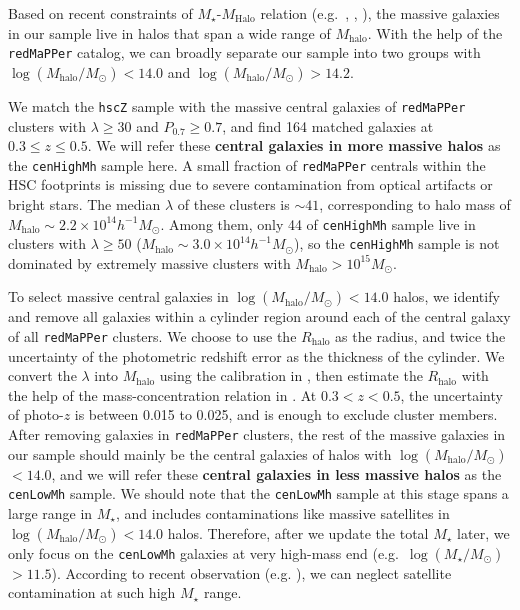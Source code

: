 \documentclass[a4paper,fleqn,usenatbib]{mnras}
\def\arcsec{{\prime\prime}}
\def\redm{\texttt{redMaPPer}}
\def\rbcg{\texttt{cenHighMh}}
\def\nbcg{\texttt{cenLowMh}}
\def\mstar{{$M_{\star}$}}
\def\mhalo{{$M_{\mathrm{halo}}$}}
\def\logms{{$\log (M_{\star}/M_{\odot})$}}
\def\logmh{{$\log (M_{\mathrm{halo}}/M_{\odot})$}}
\begin{document}
    Based on recent constraints of $M_{\star}$-$M_{\mathrm{Halo}}$ relation 
    (e.g.\ \citealt{Leauthaud2012}, \citealt{Behroozi2013}, \citealt{Kravtsov2014}),
    the massive galaxies in our sample live in halos that span a wide range of 
    \mhalo{}.
    With the help of the \redm{} catalog, we can broadly separate our sample into two
    groups with \logmh{}$<14.0$ and \logmh{}$>14.2$.
    
    
    We match the \texttt{hscZ} sample with the massive central galaxies of 
    \redm{} clusters with $\lambda \geq 30$ and $P_{\mathrm{0.7}} \geq 0.7$,
    and find 164 matched galaxies at $0.3 \leq z \leq 0.5$.
    We will refer these \textbf{central galaxies in more massive halos} as the 
    \rbcg{} sample here.
    A small fraction of \redm{} centrals within the HSC footprints is missing  
    due to severe contamination from optical artifacts or bright stars.
    The median $\lambda$ of these clusters is $\sim 41$, corresponding to 
    halo mass of $M_{\mathrm{halo}}\sim 2.2\times 10^{14} h^{-1} M_{\odot}$.
    Among them, only 44 of \rbcg{} sample live in clusters with $\lambda \geq 50$
    ($M_{\mathrm{halo}} \sim 3.0\times 10^{14} h^{-1} M_{\odot}$), so the \rbcg{} sample is 
    not dominated by extremely massive clusters with \mhalo{}$>10^{15} M_{\odot}$. 
    
    To select massive central galaxies in \logmh{}$<14.0$ halos, we identify and 
    remove all galaxies within a cylinder region around each of the central galaxy of 
    all \redm{} clusters.
    We choose to use the $R_{\mathrm{halo}}$ as the radius, and twice the uncertainty of the 
    photometric redshift error as the thickness of the cylinder. 
    We convert the $\lambda$ into $M_{\mathrm{halo}}$ using the calibration in 
    \citet{Simet2016}, then estimate the $R_{\mathrm{halo}}$ with the help of the 
    mass-concentration relation in \citet{Diemer2015}. 
    At $0.3 < z < 0.5$, the uncertainty of photo-$z$ is between 0.015 to 0.025, 
    and is enough to exclude cluster members.
    After removing galaxies in \redm{} clusters, the rest of the massive galaxies 
    in our sample should mainly be the central galaxies of halos with \logmh{}$<14.0$,
    and we will refer these \textbf{central galaxies in less massive halos} as the 
    \nbcg{} sample.
    We should note that the \nbcg{} sample at this stage spans a large range in 
    \mstar{}, and includes contaminations like massive satellites in \logmh{}$< 14.0$ 
    halos.  
    Therefore, after we update the total \mstar{} later, we only focus on the 
    \nbcg{} galaxies at very high-mass end (e.g.~\logms{}$ > 11.5$). 
    According to recent observation (e.g. \citealt{vanUitert2016}), we can neglect 
    satellite contamination at such high \mstar{} range. 
    
\end{document}
